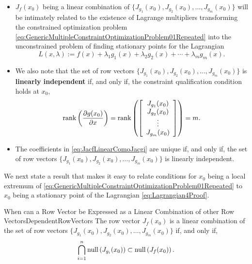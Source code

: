 \begin{itemize}
    \item $J_f(x_0)$ being a linear combination of $\{ J_{g_1}(x_0), J_{g_2}(x_0), \ldots, J_{g_m}(x_0) \}$ will be intimately related to the existence of Lagrange multipliers transforming the constrained optimization problem \eqref{eq:GenericMultipleConstraintOptimizationProblem01Repeated} into the unconstrained problem of finding stationary points for the Lagrangian
\begin{equation}
\label{eq:Lagrangian4Proof}
    L(x, \lambda):= f(x) + \lambda_1 g_1(x) + \lambda_2 g_2(x) + \cdots + \lambda_m g_m(x).
\end{equation}

    \item We also note that the set of row vectors $\{ J_{g_1}(x_0), J_{g_2}(x_0), \ldots, J_{g_m}(x_0) \}$ is \textbf{linearly independent} if, and only if, the constraint qualification condition holds at $x_0$,
\begin{equation}
\label{eq:JacobianEqualityConstraintsFullRank}
    \mathrm{rank} \left( \frac{\partial g(x_0)}{\partial x} \right) =  \mathrm{rank} \left(  \left[ \begin{array}{c} 
   J_{g_1}(x_0)\\  
    J_{g_2}(x_0)\\
    \vdots \\
    J_{g_m}(x_0)
    \end{array} \right]\right) = m.
\end{equation}
\item The coefficients in \eqref{eq:JacfLinearComoJacgi} are unique if, and only if, the set of row vectors $\{ J_{g_1}(x_0), J_{g_2}(x_0), \ldots, J_{g_m}(x_0) \}$ is linearly independent.

\end{itemize}

We next state a result that makes it easy to relate conditions for $x_0$ being a local extremum of \eqref{eq:GenericMultipleConstraintOptimizationProblem01Repeated} to $x_0$ being a stationary point of the Lagrangian \eqref{eq:Lagrangian4Proof}.

\begin{propColor}{When can a Row Vector be Expressed as a Linear Combination of other Row Vectors}{DependentRowVectors} 
The row vector $J_f(x_0)$ is a linear combination of the set of row vectors $\{ J_{g_1}(x_0), J_{g_2}(x_0), \ldots, J_{g_m}(x_0) \}$ if, and only if,
\begin{equation}
\label{eq:DependentRowVectors}
 \bigcap_{i=1}^n \mathrm{null}\left(  J_{g_i}(x_0) \right) \subset   \mathrm{null}\left( J_f(x_0) \right).
\end{equation}    
\end{propColor}

